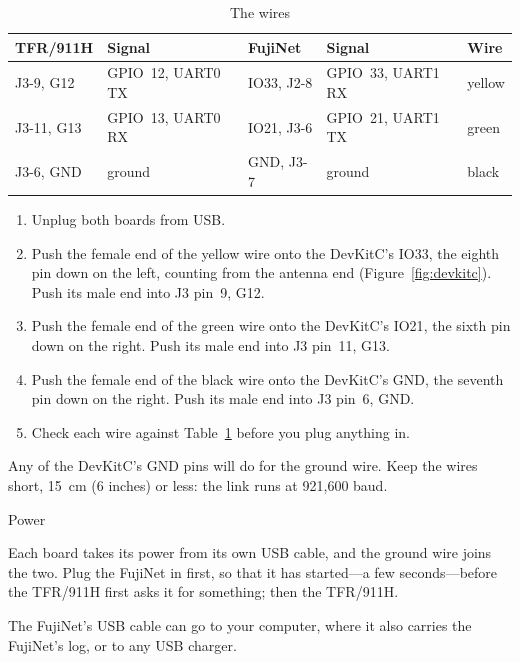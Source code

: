\documentclass[10pt,twoside,openany]{book}
\makeatletter
\newcommand{\pin}[1]{\textsf{#1}}            %
\newenvironment{steps}{\begin{enumerate}\setlength{\itemsep}{0.6ex}%
  \renewcommand{\labelenumi}{\sffamily\bfseries\arabic{enumi}.}}{\end{enumerate}}
\renewcommand{\section}{\@startsection{section}{1}{0pt}{3.2ex plus 1ex}{1.2ex}%
  {\sffamily\bfseries\large}}
\makeatother
\begin{document}
\begin{table}[H]
\caption{The wires}\label{tab:wires}
\begin{tabularx}{\linewidth}{@{}l l l l X@{}}
\toprule
\textbf{TFR/911H} & \textbf{Signal} & \textbf{FujiNet} & \textbf{Signal} & \textbf{Wire}\\
\midrule
\pin{J3-9}, \pin{G12} & GPIO~12, UART0 TX & \pin{IO33}, \pin{J2-8} & GPIO~33, UART1 RX & yellow\\
\pin{J3-11}, \pin{G13} & GPIO~13, UART0 RX & \pin{IO21}, \pin{J3-6} & GPIO~21, UART1 TX & green\\
\pin{J3-6}, \pin{GND} & ground & \pin{GND}, \pin{J3-7} & ground & black\\
\bottomrule
\end{tabularx}
\end{table}

\begin{steps}
\item Unplug both boards from USB.
\item Push the female end of the yellow wire onto the DevKitC's
\pin{IO33}, the eighth pin down on the left, counting from the antenna
end (Figure~\ref{fig:devkitc}). Push its male end into J3 pin~9,
\pin{G12}.
\item Push the female end of the green wire onto the DevKitC's
\pin{IO21}, the sixth pin down on the right. Push its male end into J3
pin~11, \pin{G13}.
\item Push the female end of the black wire onto the DevKitC's
\pin{GND}, the seventh pin down on the right. Push its male end into J3
pin~6, \pin{GND}.
\item Check each wire against Table~\ref{tab:wires} before you plug
anything in.
\end{steps}

Any of the DevKitC's \pin{GND} pins will do for the ground wire. Keep the
wires short, 15~cm (6 inches) or less: the link runs at 921{,}600 baud.

\section{Power}

Each board takes its power from its own USB cable, and the ground wire
joins the two. Plug the FujiNet in first, so that it has started---a
few seconds---before the TFR/911H first asks it for something; then the
TFR/911H.

The FujiNet's USB cable can go to your computer, where it also carries
the FujiNet's log, or to any USB charger.
\end{document}
